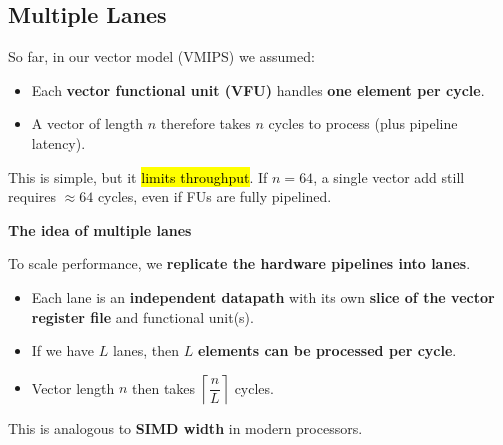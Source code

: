 \subsection{Multiple Lanes}

So far, in our vector model (VMIPS) we assumed:
\begin{itemize}
    \item Each \textbf{vector functional unit (VFU)} handles \textbf{one element per cycle}.
    \item A vector of length $n$ therefore takes $n$ cycles to process (plus pipeline latency).
\end{itemize}
This is simple, but it \hl{limits throughput}. If $n = 64$, a single vector add still requires $\approx 64$ cycles, even if FUs are fully pipelined.

\highspace
\begin{flushleft}
    \textcolor{Green3}{ \textbf{The idea of multiple lanes}}
\end{flushleft}
To scale performance, we \textbf{replicate the hardware pipelines into lanes}.
\begin{itemize}
    \item Each lane is an \textbf{independent datapath} with its own \textbf{slice of the vector register file} and functional unit(s).
    \item If we have $L$ lanes, then $L$ \textbf{elements can be processed per cycle}.
    \item Vector length $n$ then takes $\left\lceil \dfrac{n}{L} \right\rceil$ cycles.
\end{itemize}
This is analogous to \textbf{SIMD width} in modern processors.

